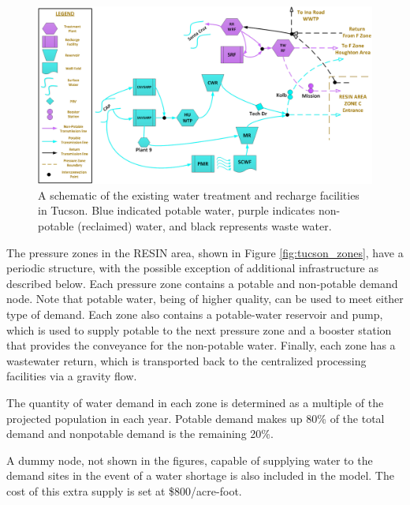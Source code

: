 \documentclass[11pt]{article}
\theoremstyle{plain}
\theoremstyle{definition}
\theoremstyle{remark}
\begin{document}
\begin{figure}
	\centering
	\includegraphics*[width=.8\textwidth]{tucson_water_images/nodes_central.png}
	\caption{
		A schematic of the existing water treatment and recharge facilities in Tucson.
		Blue indicated potable water, purple indicates non-potable (reclaimed) water, and black represents waste water.
	}
	\label{fig:tucson_treatment}
\end{figure}

The pressure zones in the RESIN area, shown in Figure \ref{fig:tucson_zones}, have a periodic structure, with the possible exception of additional infrastructure as described below.
Each pressure zone contains a potable and non-potable demand node.
Note that potable water, being of higher quality, can be used to meet either type of demand.
Each zone also contains a potable-water reservoir and pump, which is used to supply potable to the next pressure zone and a booster station that provides the conveyance for the non-potable water.
Finally, each zone has a wastewater return, which is transported back to the centralized processing facilities via a gravity flow.

The quantity of water demand in each zone is determined as a multiple of the projected population in each year.
Potable demand makes up 80\% of the total demand and nonpotable demand is the remaining 20\%.

A dummy node, not shown in the figures, capable of supplying water to the demand sites in the event of a water shortage is also included in the model.
The cost of this extra supply is set at \$800/acre-foot.
\end{document}
